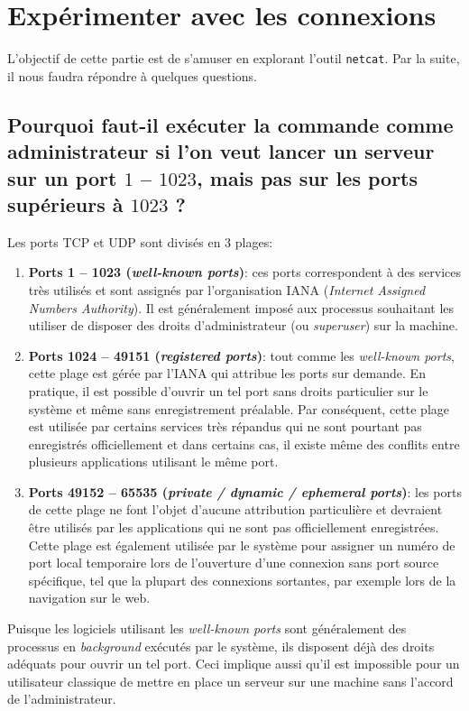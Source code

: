 \documentclass[11pt,a4paper]{article}
\begin{document}
\section{Expérimenter avec les connexions}

L'objectif de cette partie est de s'amuser en explorant l'outil \texttt{netcat}. Par la suite, il nous faudra répondre à quelques questions.

\subsection{Pourquoi faut-il exécuter la commande comme administrateur si l'on veut lancer un serveur sur un port $1$ -- $1023$, mais pas sur les ports supérieurs à $1023$ ?}

Les ports TCP et UDP sont divisés en 3 plages:
\begin{enumerate}
	\item \textbf{Ports 1 -- 1023 (\textit{well-known ports})}: ces ports correspondent à des services très utilisés et sont assignés par l'organisation IANA (\textit{Internet Assigned Numbers Authority}). Il est généralement imposé aux processus souhaitant les utiliser de disposer des droits d'administrateur (ou \textit{superuser}) sur la machine.
	\item \textbf{Ports 1024 -- 49151 (\textit{registered ports})}: tout comme les \textit{well-known ports}, cette plage est gérée par l'IANA qui attribue les ports sur demande. En pratique, il est possible d'ouvrir un tel port sans droits particulier sur le système et même sans enregistrement préalable. Par conséquent, cette plage est utilisée par certains services très répandus qui ne sont pourtant pas enregistrés officiellement et dans certains cas, il existe même des conflits entre plusieurs applications utilisant le même port.
	\item \textbf{Ports 49152 -- 65535 (\textit{private / dynamic / ephemeral ports})}: les ports de cette plage ne font l'objet d'aucune attribution particulière et devraient être utilisés par les applications qui ne sont pas officiellement enregistrées. Cette plage est également utilisée par le système pour assigner un numéro de port local temporaire lors de l'ouverture d'une connexion sans port source spécifique, tel que la plupart des connexions sortantes, par exemple lors de la navigation sur le web.
\end{enumerate}

Puisque les logiciels utilisant les \textit{well-known ports} sont généralement des processus en \textit{background} exécutés par le système, ils disposent déjà des droits adéquats pour ouvrir un tel port. Ceci implique aussi qu'il est impossible pour un utilisateur classique de mettre en place un serveur sur une machine sans l'accord de l'administrateur.
\end{document}
